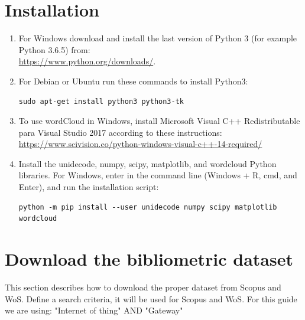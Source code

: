 \documentclass[10pt,letterpaper]{article}
\begin{document}
\section{Installation}

\begin{enumerate}
\item For Windows download and install the last version of Python 3 (for example Python 3.6.5) from: \\ \url{https://www.python.org/downloads/}.
\item For Debian or Ubuntu run these commands to install Python3: 
\begin{verbatim}
sudo apt-get install python3 python3-tk
\end{verbatim}

\item To use wordCloud in Windows, install Microsoft Visual C++ Redistributable para Visual Studio 2017 according to these instructions: \url{https://www.scivision.co/python-windows-visual-c++-14-required/}

\item Install the unidecode, numpy, scipy, matplotlib, and wordcloud Python libraries. For Windows, enter in the command line (Windows + R, cmd, and Enter), and run the installation script:
\begin{verbatim}
python -m pip install --user unidecode numpy scipy matplotlib wordcloud
\end{verbatim}
\end{enumerate}

\section{Download the bibliometric dataset}
This section describes how to download the proper dataset from Scopus and WoS. Define a search criteria, it will be used for Scopus and WoS. For this guide we are using: "Internet of thing"  AND  "Gateway" 
\end{document}
